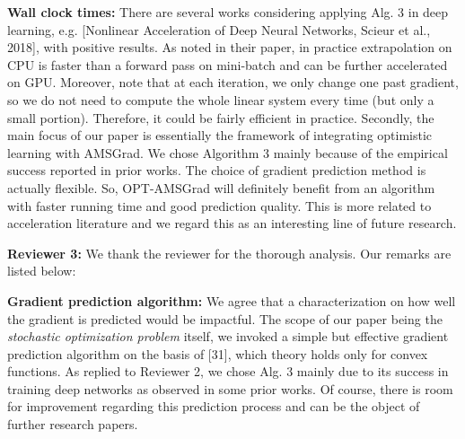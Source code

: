 \documentclass{article}
\begin{document}
\textbf{Wall clock times:}
There are several works considering applying Alg. 3 in deep learning, e.g. [Nonlinear Acceleration of Deep Neural Networks, Scieur et al., 2018], with positive results. As noted in their paper, in practice extrapolation on CPU is faster than a forward pass on mini-batch and can be further accelerated on GPU. Moreover, note that at each iteration, we only change one past gradient, so we do not need to compute the whole linear system every time (but only a small portion).  Therefore, it could be fairly efficient in practice. Secondly, the main focus of our paper is essentially the framework of integrating optimistic learning with AMSGrad. We chose Algorithm 3 mainly because of the empirical success reported in prior works. The choice of gradient prediction method is actually flexible. So, OPT-AMSGrad will definitely benefit from an algorithm with faster running time and good prediction quality. This is more related to acceleration literature and we regard this as an interesting line of future research.\vspace{-5pt}


\vspace{0.05in}
\textbf{\textcolor{green!50!black}{Reviewer 3:}} We thank the reviewer for the thorough analysis. Our remarks are listed below:\vspace{-5pt}

\textbf{Gradient prediction algorithm:}
We agree that a characterization on how well the gradient is predicted would be impactful.
The scope of our paper being the \emph{stochastic optimization problem} itself, we invoked a simple but effective gradient prediction algorithm on the basis of [31], which theory holds only for convex functions. 
As replied to Reviewer 2, we chose Alg. 3 mainly due to its success in training deep networks as observed in some prior works.
Of course, there is room for improvement regarding this prediction process and can be the object of further research papers.\vspace{-5pt}

\end{document}
